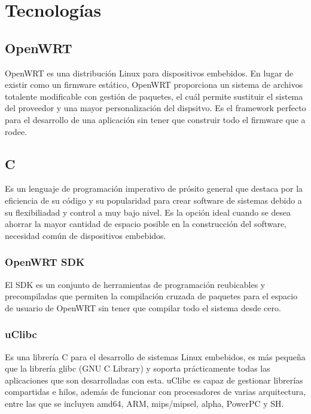 \documentclass{article}
\begin{document}


\section{Tecnologías}
    \subsection{OpenWRT}
        OpenWRT es una distribución Linux para dispositivos embebidos. En lugar de existir como un firmware estático, OpenWRT proporciona un sistema de archivos totalente modificable con gestión de paquetes, el cuál permite sustituir el sistema del proveedor y una mayor personalización del dispsitvo. Es el framework perfecto para el desarrollo de una aplicación sin tener que construir todo el firmware que a rodee.

    \subsection{C}
        Es un lenguaje de programación imperativo de prósito general que destaca por la eficiencia de su código y su popularidad para crear software de sistemas debido a su flexibiliadad y control a muy bajo nivel. Es la opción ideal cuando se desea ahorrar la mayor cantidad de espacio posible en la construcción del software, necesidad común de dispositivos embebidos. 

        \subsubsection{OpenWRT SDK}
            El SDK es un conjunto de herramientas de programación reubicables y precompiladas que permiten la compilación cruzada de paquetes para el espacio de usuario de OpenWRT sin tener que compilar todo el sistema desde cero.

        \subsubsection{uClibc}
            Es una librería C para el desarrollo de sistemas Linux embebidos, es más pequeña que la librería  glibc (GNU C Library) y soporta prácticamente todas las aplicaciones que son desarrolladas con esta. uClibc  es capaz de gestionar librerías compartidas e hilos, además de funcionar con procesadores de varias arquitectura, entre las que se incluyen amd64, ARM, mips/mipsel, alpha, PowerPC y SH.
\end{document}
